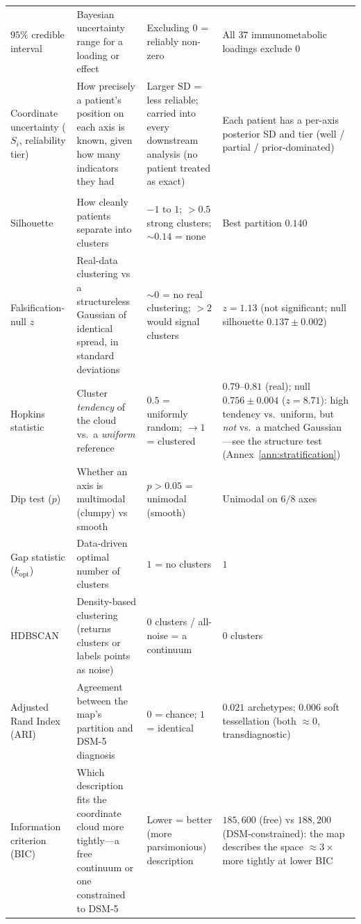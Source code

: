 {\begin{longtable}{@{}p{2.5cm}p{4.2cm}p{3.0cm}p{4.5cm}@{}}
\addlinespace
$95\%$ credible interval & Bayesian uncertainty range for a loading or effect & Excluding $0$ = reliably non-zero & All $37$ immunometabolic loadings exclude $0$ \\
\addlinespace
Coordinate uncertainty ($S_i$, reliability tier) & How precisely a patient's position on each axis is known, given how many indicators they had & Larger SD = less reliable; carried into every downstream analysis (no patient treated as exact) & Each patient has a per-axis posterior SD and tier (well / partial / prior-dominated) \\
\addlinespace
\multicolumn{4}{@{}l}{\textbf{\textit{C. Continuum or distinct biotypes?} (stratification, M2)}} \\
\addlinespace
Silhouette & How cleanly patients separate into clusters & $-1$ to $1$; ${>}0.5$ strong clusters; ${\sim}0.14$ = none & Best partition $0.140$ \\
\addlinespace
Falsification-null $z$ & Real-data clustering vs a structureless Gaussian of identical spread, in standard deviations & ${\sim}0$ = no real clustering; ${>}2$ would signal clusters & $z=1.13$ (not significant; null silhouette $0.137\pm0.002$) \\
\addlinespace
Hopkins statistic & Cluster \emph{tendency} of the cloud vs.\ a \emph{uniform} reference & $0.5$ = uniformly random; $\to1$ = clustered & $0.79$--$0.81$ (real); null $0.756\pm0.004$ ($z=8.71$): high tendency vs.\ uniform, but \emph{not} vs.\ a matched Gaussian---see the structure test (Annex~\ref{ann:stratification}) \\
\addlinespace
Dip test ($p$) & Whether an axis is multimodal (clumpy) vs smooth & $p{>}0.05$ = unimodal (smooth) & Unimodal on $6/8$ axes \\
\addlinespace
Gap statistic ($k_{\text{opt}}$) & Data-driven optimal number of clusters & $1$ = no clusters & $1$ \\
\addlinespace
HDBSCAN & Density-based clustering (returns clusters or labels points as noise) & $0$ clusters / all-noise = a continuum & $0$ clusters \\
\addlinespace
Adjusted Rand Index (ARI) & Agreement between the map's partition and DSM-5 diagnosis & $0$ = chance; $1$ = identical & $0.021$ archetypes; $0.006$ soft tessellation (both $\approx0$, transdiagnostic) \\
\addlinespace
Information criterion (BIC) & Which description fits the coordinate cloud more tightly---a free continuum or one constrained to DSM-5 & Lower = better (more parsimonious) description & $185{,}600$ (free) vs $188{,}200$ (DSM-constrained): the map describes the space ${\approx}3\times$ more tightly at lower BIC \\

\end{longtable}}
